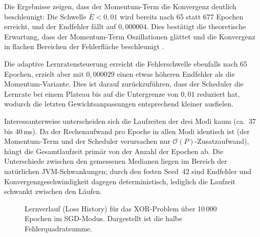 Die Ergebnisse zeigen, dass der Momentum-Term die Konvergenz deutlich beschleunigt: Die Schwelle $\overline{E}<0{,}01$ wird bereits nach 65 statt 677 Epochen erreicht, und der Endfehler fällt auf $0{,}000004$. Dies bestätigt die theoretische Erwartung, dass der Momentum-Term Oszillationen glättet und die Konvergenz in flachen Bereichen der Fehlerfläche beschleunigt \parencite{aggarwal2023}.

Die adaptive Lernratensteuerung erreicht die Fehlerschwelle ebenfalls nach 65 Epochen, erzielt aber mit $0{,}000029$ einen etwas höheren Endfehler als die Momentum-Variante. Dies ist darauf zurückzuführen, dass der Scheduler die Lernrate bei einem Plateau bis auf die Untergrenze von $0{,}01$ reduziert hat, wodurch die letzten Gewichtsanpassungen entsprechend kleiner ausfielen.

Interessanterweise unterscheiden sich die Laufzeiten der drei Modi kaum (ca.\ 37 bis 40\,ms). Da der Rechenaufwand pro Epoche in allen Modi identisch ist (der Momentum-Term und der Scheduler verursachen nur $\mathcal{O}(P)$-Zusatzaufwand), hängt die Gesamtlaufzeit primär von der Anzahl der Epochen ab. Die Unterschiede zwischen den gemessenen Medianen liegen im Bereich der natürlichen JVM-Schwankungen; durch den festen Seed~42 sind Endfehler und Konvergenzgeschwindigkeit dagegen deterministisch, lediglich die Laufzeit schwankt zwischen den Läufen.

\begin{figure}[htbp]
	\centering
	\caption{Lernverlauf (Loss History) für das XOR-Problem über 10\,000 Epochen im SGD-Modus. Dargestellt ist die halbe Fehlerquadratsumme.}
	\label{fig:loss_history}
\end{figure}

